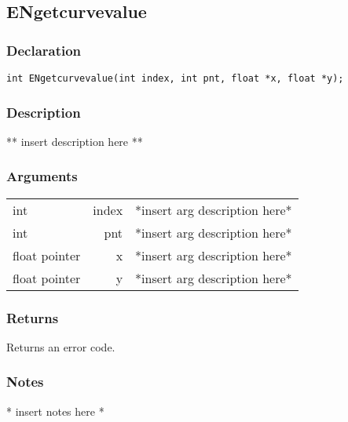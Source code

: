 \subsection{ENgetcurvevalue}
\subsubsection{Declaration}
\begin{lstlisting}
int ENgetcurvevalue(int index, int pnt, float *x, float *y);
\end{lstlisting}
\subsubsection{Description}
** insert description here **
\subsubsection{Arguments}
\begin{tabular}{l r p{11cm} }
int&index&*insert arg description here* \\[6pt]
int&pnt&*insert arg description here* \\[6pt]
float pointer&x&*insert arg description here* \\[6pt]
float pointer&y&*insert arg description here* \\[6pt]
\end{tabular}
\subsubsection{Returns}
Returns an error code.
\subsubsection{Notes}
* insert notes here *